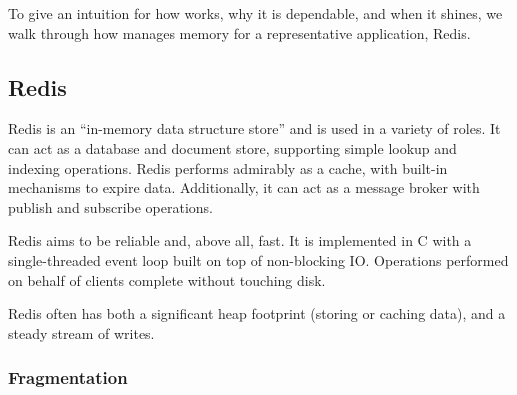 To give an intuition for how \mesh works, why it is dependable, and
when it shines, we walk through how \mesh manages memory for a
representative application, Redis.



\subsection{Redis}

Redis is an ``in-memory data structure store'' and is used in a
variety of roles.  It can act as a database and document store,
supporting simple lookup and indexing operations.  Redis performs
admirably as a cache, with built-in mechanisms to expire data.
Additionally, it can act as a message broker with publish and
subscribe operations.

Redis aims to be reliable and, above all, fast.  It is implemented in C
with a single-threaded event loop built on top of non-blocking IO.
Operations performed on behalf of clients complete without touching
disk.

Redis often has both a significant heap footprint (storing or caching
data), and a steady stream of writes.

\subsubsection{Fragmentation}


